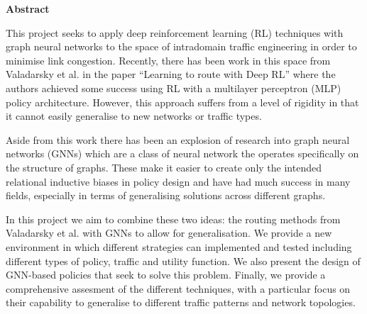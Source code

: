 \newpage
{\Huge \bf Abstract}
\vspace{24pt} 

This project seeks to apply deep reinforcement learning (RL) techniques with graph neural networks to the space of intradomain traffic engineering in order to minimise link congestion. Recently, there has been work in this space from Valadarsky et al. in the paper ``Learning to route with Deep RL'' where the authors achieved some success using RL with a multilayer perceptron (MLP) policy architecture. However, this approach suffers from a level of rigidity in that it cannot easily generalise to new networks or traffic types.

Aside from this work there has been an explosion of research into graph neural networks (GNNs) which are a class of neural network the operates specifically on the structure of graphs. These make it easier to create only the intended relational inductive biases in policy design and have had much success in many fields, especially in terms of generalising solutions across different graphs.

In this project we aim to combine these two ideas: the routing methods from Valadarsky et al. with GNNs to allow for generalisation. We provide a new environment in which different strategies can implemented and tested including different types of policy, traffic and utility function. We also present the design of GNN-based policies that seek to solve this problem. Finally, we provide a comprehensive assesment of the different techniques, with a particular focus on their capability to generalise to different traffic patterns and network topologies.

\newpage
\vspace*{\fill}
